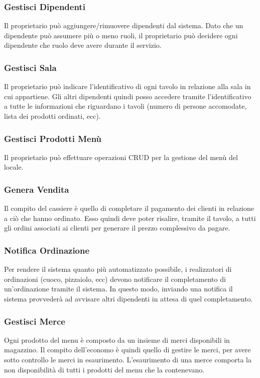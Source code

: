 \subsubsection{Gestisci Dipendenti}
Il proprietario può aggiungere/rimuovere dipendenti dal sistema. Dato che un dipendente può assumere più o meno ruoli, il proprietario può decidere ogni dipendente che ruolo deve avere durante il servizio.

\subsubsection{Gestisci Sala}
Il proprietario può indicare l'identificativo di ogni tavolo in relazione alla sala in cui appartiene. Gli altri dipendenti quindi posso accedere tramite l'identificativo a tutte le informazioni che riguardano i tavoli (numero di persone accomodate, lista dei prodotti ordinati, ecc).

\subsubsection{Gestisci Prodotti Menù}
Il proprietario può effettuare operazioni CRUD per la gestione del menù del locale.

\subsubsection{Genera Vendita}
Il compito del cassiere è quello di completare il pagamento dei clienti in relazione a ciò che hanno ordinato. Esso quindi deve poter risalire, tramite il tavolo, a tutti gli ordini associati ai clienti per generare il prezzo complessivo da pagare.

\subsubsection{Notifica Ordinazione}
Per rendere il sistema quanto più automatizzato possibile, i realizzatori di ordinazioni (cuoco, pizzaiolo, ecc) devono notificare il completamento di un'ordinazione tramite il sistema. In questo modo, inviando una notifica il sistema provvederà ad avvisare altri dipendenti in attesa di quel completamento.

\subsubsection{Gestisci Merce}
Ogni prodotto del menu è composto da un insieme di merci disponibili in magazzino. Il compito dell'economo è quindi quello di gestire le merci, per avere sotto controllo le merci in esaurimento. L'esaurimento di una merce comporta la non disponibilità di tutti i prodotti del menu che la contenevano.

